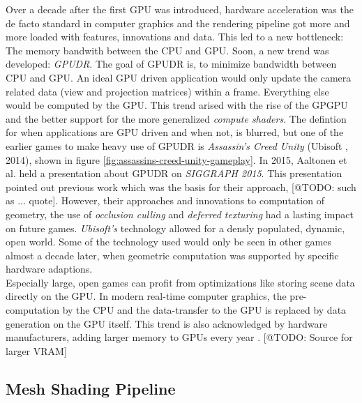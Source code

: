 Over a decade after the first \ac{GPU} was introduced, hardware acceleration was the de facto standard in 
computer graphics and the rendering pipeline got more and more loaded with features, innovations and data. 
This led to a new bottleneck: The memory bandwith between the \ac{CPU} and \ac{GPU}. Soon, a new trend was 
developed: \emph{\ac{GPUDR}}. The goal of \ac{GPUDR} is, to minimize bandwidth between \ac{CPU} and \ac{GPU}. 
An ideal \ac{GPU} driven application would only update the camera related data (view and projection matrices) 
within a frame. Everything else would be computed by the \ac{GPU}. This trend arised with the rise of the 
\ac{GPGPU} and the better support for the more generalized \emph{compute shaders}. The defintion for when 
applications are \ac{GPU} driven and when not, is blurred, but one of the earlier games to make heavy use of 
\ac{GPUDR} is \emph{Assassin's Creed Unity} (Ubisoft \cite{Ubisoft2014}, 2014), shown in figure 
\ref{fig:assassins-creed-unity-gameplay}. In 2015, Aaltonen et al. \cite{Aaltonen2015} held a presentation 
about \ac{GPUDR} on \emph{SIGGRAPH 2015}. This presentation pointed out previous work which was the basis for 
their approach, [@TODO: such as ... quote]. However, their approaches and innovations to computation of geometry, 
the use of \emph{occlusion culling} and \emph{deferred texturing} had a lasting impact on future games. 
\emph{Ubisoft's} technology allowed for a densly populated, dynamic, open world. Some of the technology used 
would only be seen in other games almost a decade later, when geometric computation was supported by specific 
hardware adaptions.\\

\noindent
Especially large, open games can profit from optimizations like storing scene data directly on the \ac{GPU}. 
In modern real-time computer graphics, the pre-computation by the \ac{CPU} and the data-transfer to the \ac{GPU} 
is replaced by data generation on the \ac{GPU} itself. This trend is also acknowledged by hardware manufacturers, 
adding larger memory to \ac{GPU}s every year \cite{}. [@TODO: Source for larger VRAM] 

\subsection*{Mesh Shading Pipeline} \label{subsec-mesh-shading-pipeline}


